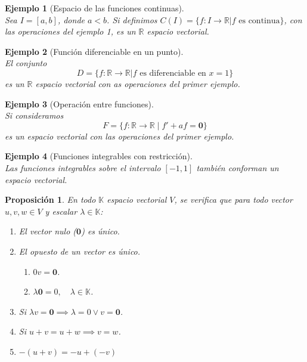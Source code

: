 \documentclass[b5paper, 11pt]{book}
\newcommand{\0}{\mathbf{0}}
\newcommand{\K}{\mathds{K}}
\newcommand{\R}{\mathds{R}}
\theoremstyle{estiloB}
\theoremstyle{estiloC}
\theoremstyle{estiloD}
\newtheorem{propo}{Proposición}[chapter]
\theoremstyle{estiloE}
\newtheorem{ejem}{Ejemplo}[chapter]
\begin{document}
\begin{ejem}[Espacio de las funciones continuas]\textcolor{white}{.}\\
Sea $I= [a,b]$, donde $a<b$. Si definimos $C(I)= \{ f :I \to \R | f \text{ es continua} \}$, con las operaciones del ejemplo 1, es un $\R$ espacio vectorial.
\end{ejem}

\begin{ejem}[Función diferenciable en un punto]\textcolor{white}{.}\\
El conjunto
\[
D= \{ f: \R \to \R | f \text{ es diferenciable en } x=1 \}
\]
es un $\R$ espacio vectorial con as operaciones del primer ejemplo.
\end{ejem}

\begin{ejem}[Operación entre funciones]\textcolor{white}{.}\\
Si consideramos
\[
F= \{ f: \R \to \R \; | \; f' +af= \0 \}
\]
es un espacio vectorial con las operaciones del primer ejemplo.
\end{ejem}

\begin{ejem}[Funciones integrables con restricción]\textcolor{white}{.}\\
Las funciones integrables sobre el intervalo $[-1,1]$ también conforman un espacio vectorial.
\end{ejem}

\begin{propo}En todo $\K$ espacio vectorial $V$, se verifica que para todo vector $u, v, w \in V$ y escalar $\lambda \in \K$:
\begin{enumerate}
\item El vector nulo ($\0$) es único.
\item El opuesto de un vector es único.
\begin{enumerate}
	\item $0v = \0$.
	\item $\lambda \0= 0, \quad \lambda \in \K$.
\end{enumerate}
\item Si $\lambda v = \0 \implies \lambda = 0 \vee v= \0$.
\item Si $u+ v = u+ w \implies v= w$.
\item $-(u+v)= -u +(-v)$
\end{enumerate}
\end{propo}
\end{document}
